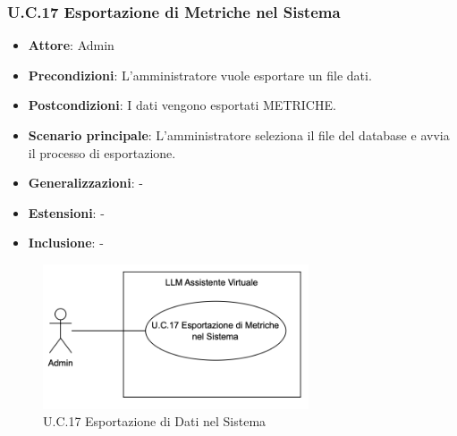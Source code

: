 \subsubsection{U.C.17 Esportazione di Metriche nel Sistema} 
\begin{itemize}
    \item \textbf{Attore}: Admin
    \item \textbf{Precondizioni}: L’amministratore vuole esportare un file dati.
    \item \textbf{Postcondizioni}: I dati vengono esportati   METRICHE.
    \item \textbf{Scenario principale}: L'amministratore seleziona il file del database e avvia il processo di esportazione.
    \item \textbf{Generalizzazioni}: -
    \item \textbf{Estensioni}: -
    \item \textbf{Inclusione}: -
\end{itemize}
\begin{figure}[H]
    \centering
    \includegraphics[width=0.7\textwidth]{img/UC17.png}
    \caption{U.C.17 Esportazione di Dati nel Sistema}
\end{figure}
\newpage

